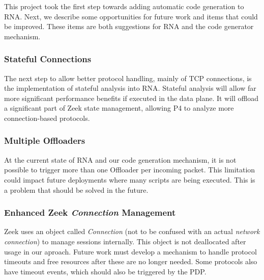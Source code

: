This project took the first step towards adding automatic code generation to RNA. Next, we describe some opportunities for future work and items that could be improved. These items are both suggestions for RNA and the code generator mechanism.

\subsubsection*{Stateful Connections}

The next step to allow better protocol handling, mainly of TCP connections, is the implementation of stateful analysis into RNA. Stateful analysis will allow far more significant performance benefits if executed in the data plane. It will offload a significant part of Zeek state management, allowing P4 to analyze more connection-based protocols.


\subsubsection*{Multiple Offloaders}

At the current state of RNA and our code generation mechanism, it is not possible to trigger more than one Offloader per incoming packet. This limitation could impact future deployments where many scripts are being executed. This is a problem that should be solved in the future.


\subsubsection*{Enhanced Zeek \textit{Connection} Management}

Zeek uses an object called \textit{Connection} (not to be confused with an actual \textit{network connection}) to manage sessions internally. This object is not deallocated after usage in our aproach. Future work must develop a mechanism to handle protocol timeouts and free resources after these are no longer needed. Some protocols also have timeout events, which should also be triggered by the PDP.

